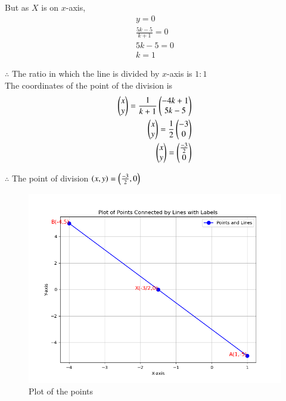 \documentclass[journal]{IEEEtran}
\begin{document}
But as $X$ is on $x$-axis,
\begin{align}
y=0\\
\frac{5k-5}{k+1}=0 \label{eq1.1.5.10.6} \\
5k-5=0 \label{eq1.1.5.10.7} \\
k=1 \label{eq1.1.5.10.8}
\end{align}

$\therefore$ The ratio in which the line is divided by $x$-axis is $1:1$ \\
The coordinates of the point of the division is \\
\begin{align}
\begin{pmatrix}
x \\
y \\
\end{pmatrix}
=\frac{1}{k+1}
\begin{pmatrix}
-4k+1 \\
5k-5 \\
\end{pmatrix} \label{eq1.1.5.10.9}
\\
\begin{pmatrix}
x \\
y\\
\end{pmatrix}
=\frac{1}{2}
\begin{pmatrix}
-3 \\
0 \\
\end{pmatrix} \label{eq1.1.5.10.10}
\\
\begin{pmatrix}
x \\
y \\
\end{pmatrix}
=
\begin{pmatrix}
\frac{-3}{2} \\
0 \\
\end{pmatrix} \label{eq1.1.5.10.11}
\end{align}

$\therefore$ The point of division $\left(x,y\right)=\left(\frac{-3}{2},0\right)$

\begin{figure}[h!]
\renewcommand{\thefigure}{1}
    \centering
    \includegraphics[width=0.7\linewidth]{figs/Figure_1.png}
    \caption{Plot of the points}
    \label{fig1.1.5.10.1}
\end{figure}
\end{document}
